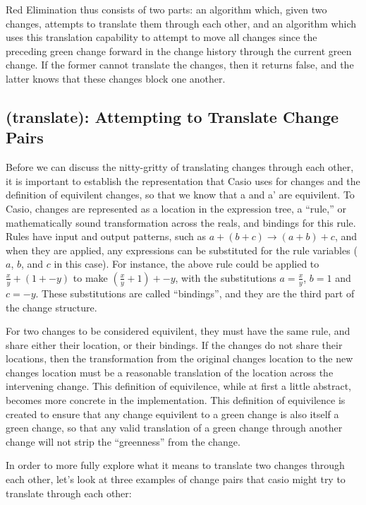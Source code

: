 \documentclass{article}
\begin{document}
Red Elimination thus consists of two parts: 
an algorithm which, given two changes, 
attempts to translate them through each other, 
and an algorithm which uses this translation capability 
to attempt to move all changes since the preceding green change 
forward in the change history 
through the current green change. 
If the former cannot translate the changes, 
then it returns false, 
and the latter knows that these changes block one another.

\subsection{(translate): Attempting to Translate Change Pairs}

Before we can discuss the nitty-gritty of translating changes through each other, 
it is important to establish the representation that Casio uses for changes 
and the definition of equivilent changes, 
so that we know that a and a' are equivilent. 
To Casio, changes are represented as a location in the expression tree, 
a ``rule,'' or mathematically sound transformation across the reals, 
and bindings for this rule. 
Rules have input and output patterns, 
such as $a + (b + c) \to (a + b) + c$,
and when they are applied, 
any expressions can be substituted for the rule variables 
($a$, $b$, and $c$ in this case). 
For instance, 
the above rule could be applied 
to $\frac{x}{y} + (1 + -y)$ 
to make $(\frac{x}{y} + 1) + -y$, 
with the substitutions $a = \frac{x}{y}$, $b = 1$ and $c = -y$. 
These substitutions are called ``bindings'', 
and they are the third part of the change structure.

For two changes to be considered equivilent, 
they must have the same rule, 
and share either their location, 
or their bindings. 
If the changes do not share their locations, 
then the transformation from the original changes location 
to the new changes location must be a reasonable translation 
of the location across the intervening change. 
This definition of equivilence, 
while at first a little abstract, 
becomes more concrete in the implementation. 
This definition of equivilence is created to ensure 
that any change equivilent to a green change 
is also itself a green change, 
so that any valid translation of a green change 
through another change 
will not strip the ``greenness'' from the change.

In order to more fully explore what it means
to translate two changes through each other,
let's look at three examples
of change pairs that casio might try to translate through each other:
\end{document}
